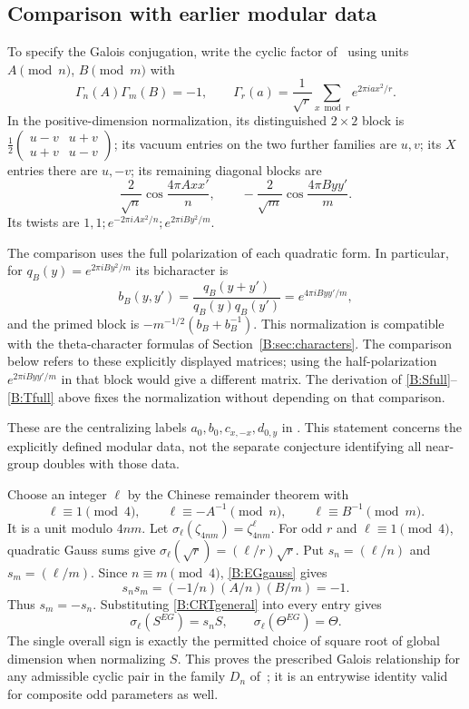 \documentclass[11pt]{article}
\numberwithin{equation}{section}
\begin{document}
\subsection{Comparison with earlier modular data}\label{B:sec:galois}
To specify the Galois conjugation, write the cyclic factor of~\cite{A:EG} using units $A\pmod n$, $B\pmod m$ with
\begin{equation}\label{B:EGgauss}
 \Gamma_n(A)\Gamma_m(B)=-1,\qquad
 \Gamma_r(a)=\frac1{\sqrt r}\sum_{x\bmod r}e^{2\pi iax^2/r}.
\end{equation}
In the positive-dimension normalization, its distinguished $2\times2$ block is
$\frac12\left(\begin{smallmatrix}u-v&u+v\\u+v&u-v\end{smallmatrix}\right)$;
its vacuum entries on the two further families are $u,v$; its $X$ entries there are $u,-v$; its remaining diagonal blocks are
\[
 \frac2{\sqrt n}\cos\frac{4\pi Axx'}n,\qquad
 -\frac2{\sqrt m}\cos\frac{4\pi Byy'}m.
\]
Its twists are $1,1;e^{-2\pi iAx^2/n};e^{2\pi iBy^2/m}$.

The comparison uses the full polarization of each quadratic form. In particular, for $q_B(y)=e^{2\pi iBy^2/m}$ its bicharacter is
\[
b_B(y,y')=\frac{q_B(y+y')}{q_B(y)q_B(y')}=e^{4\pi iByy'/m},
\]
and the primed block is $-m^{-1/2}(b_B+b_B^{-1})$. This normalization is compatible with the theta-character formulas of Section~\ref{B:sec:characters}. The comparison below refers to these explicitly displayed matrices; using the half-polarization $e^{2\pi iByy'/m}$ in that block would give a different matrix. The derivation of \eqref{B:Sfull}--\eqref{B:Tfull} above fixes the normalization without depending on that comparison.

These are the centralizing labels $a_0,b_0,c_{x,-x},d_{0,y}$ in \cite[Proposition 7(b), Section 4.4]{A:EG}. This statement concerns the explicitly defined modular data, not the separate conjecture identifying all near-group doubles with those data.

Choose an integer $\ell$ by the Chinese remainder theorem with
\begin{equation}\label{B:CRTgeneral}
 \ell\equiv1\pmod4,\qquad
 \ell\equiv-A^{-1}\pmod n,\qquad
 \ell\equiv B^{-1}\pmod m.
\end{equation}
It is a unit modulo $4nm$. Let $\sigma_\ell(\zeta_{4nm})=\zeta_{4nm}^{\ell}$. For odd $r$ and $\ell\equiv1\pmod4$, quadratic Gauss sums give
$\sigma_\ell(\sqrt r)=(\ell/r)\sqrt r$.
Put $s_n=(\ell/n)$ and $s_m=(\ell/m)$. Since $n\equiv m\pmod4$, \eqref{B:EGgauss} gives
\[
 s_ns_m=(-1/n)(A/n)(B/m)=-1.
\]
Thus $s_m=-s_n$. Substituting \eqref{B:CRTgeneral} into every entry gives
\begin{equation}\label{B:EGcomparison}
 \sigma_\ell(S^{EG})=s_n S,\qquad
 \sigma_\ell(\Theta^{EG})=\Theta.
\end{equation}
The single overall sign is exactly the permitted choice of square root of global dimension when normalizing $S$. This proves the prescribed Galois relationship for any admissible cyclic pair in the family $D_n$ of~\cite{A:EG}; it is an entrywise identity valid for composite odd parameters as well.
\end{document}
